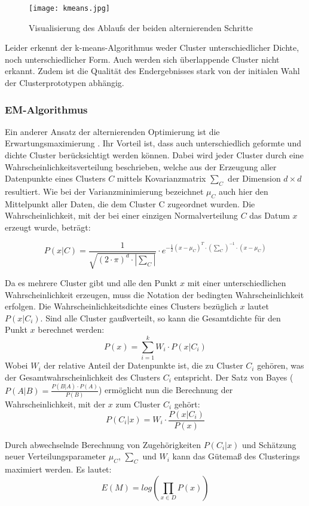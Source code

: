 \documentclass[11pt,ceqn]{book}
\begin{document}
\begin{figure}[H]
\centering
\texttt{[image: kmeans.jpg]}
\caption{Visualisierung des Ablaufs der beiden alternierenden Schritte}\label{cluster}
\end{figure}

Leider erkennt der k-means-Algorithmus weder Cluster unterschiedlicher Dichte, noch unterschiedlicher Form. Auch werden sich überlappende Cluster nicht erkannt. Zudem ist die Qualität des Endergebnisses stark von der initialen Wahl der Clusterprototypen abhängig.

\subsubsection{EM-Algorithmus}
Ein anderer Ansatz der alternierenden Optimierung ist die Erwartungsmaximierung \cite{emalg}. Ihr Vorteil ist, dass auch unterschiedlich geformte und dichte Cluster berücksichtigt werden können. Dabei wird jeder Cluster durch eine Wahrscheinlichkeitsverteilung beschrieben, welche aus der Erzeugung aller Datenpunkte eines Clusters $C$ mittels Kovarianzmatrix $\sum_C$ der Dimension $d \times d$ resultiert. Wie bei der Varianzminimierung bezeichnet $\mu_C$ auch hier den Mittelpunkt aller Daten, die dem Cluster C zugeordnet wurden. Die Wahrscheinlichkeit, mit der bei einer einzigen Normalverteilung $C$ das Datum $x$ erzeugt wurde, beträgt:

$$P(x|C) = \frac{1}{\sqrt{(2\cdot \pi)^d \cdot |\sum_C|}} \cdot e^{-\frac{1}{2}(x - \mu_C)^T \cdot (\sum_C)^{-1} \cdot (x - \mu_C)}$$ 

Da es mehrere Cluster gibt und alle den Punkt $x$ mit einer unterschiedlichen Wahrscheinlichkeit erzeugen, muss die Notation der bedingten Wahrscheinlichkeit erfolgen. Die Wahrscheinlichkeitsdichte eines Clusters bezüglich $x$ lautet $P(x|C_i)$. Sind alle Cluster gaußverteilt, so kann die Gesamtdichte für den Punkt $x$ berechnet werden: $$P(x) = \sum_{i=1}^k W_i \cdot P(x|C_i)$$ 
Wobei $W_i$ der relative Anteil der Datenpunkte ist, die zu Cluster $C_i$ gehören, was der Gesamtwahrscheinlichkeit des Clusters $C_i$ entspricht. Der Satz von Bayes ($P(A|B) = \frac{P(B|A)\cdot P(A)}{P(B)}$) ermöglicht nun die Berechnung der Wahrscheinlichkeit, mit der $x$ zum Cluster $C_i$ gehört:
$$P(C_i|x) = W_i \cdot \frac{P(x|C_i)}{P(x)}$$

Durch abwechselnde Berechnung von Zugehörigkeiten $P(C_i|x)$ und Schätzung neuer Verteilungsparameter $\mu_C$, $\sum_C$ und $W_i$ kann das Gütemaß des Clusterings maximiert werden. Es lautet:
$$E(M) = log\left(\prod_{x \in D} P(x)\right)$$
\end{document}
